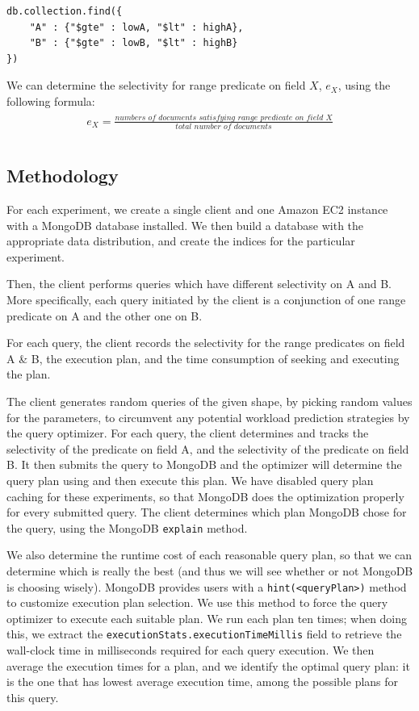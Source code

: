 \begin{lstlisting}[caption=Query Shape in MongoDB Query Syntax, label=algo:queryshape]
db.collection.find({
    "A" : {"$gte" : lowA, "$lt" : highA},
    "B" : {"$gte" : lowB, "$lt" : highB}
})
\end{lstlisting}

We can determine the selectivity for range predicate on field $X$, $e_X$, 
using the following formula:
\begin{align}
\begin{split}
 e_X= \frac{\textit{numbers of documents satisfying range 
 predicate on field X}}{\textit{total number of documents}} \\
 \end{split}
\end{align}

\subsection{Methodology}
For each experiment, we create a single client and 
one Amazon EC2 instance with a MongoDB database installed. 
We then build a database with the appropriate data distribution, and create the indices for the particular experiment.

Then, the client performs queries which have different 
selectivity on A and B. More specifically, each query 
initiated by the client is a conjunction of one range 
predicate on A and the other one on B.

For each query, the client records the selectivity for the 
range predicates on field A \& B, the execution plan, and 
the time consumption of seeking and executing the plan. 

The client generates random queries of the given shape, by picking random values for the parameters, to circumvent any potential workload prediction strategies by the query optimizer. For each query, the client determines and tracks the selectivity of the predicate on field A, and the selectivity of the predicate on field B. It then submits the query to MongoDB and the optimizer will determine the query plan using \approachName and then execute this plan. We have disabled query plan caching for these experiments, so that MongoDB does the optimization properly for every submitted query. The client determines which plan MongoDB chose for the query, using the MongoDB \verb|explain| method.

We also determine the runtime cost of each reasonable query plan, so that we can determine which is really the best (and thus we will see whether or not MongoDB is choosing wisely). %
MongoDB provides users with a \verb|hint(<queryPlan>)| method to customize execution plan selection. We use this method to force the query optimizer to execute each suitable plan. We run each plan ten times; when doing this, we extract the \texttt{execution\-Stats.\-execution\-Time\-Millis} field to retrieve
the wall-clock time in milliseconds required for each query execution. We then average the execution times for a plan, and we identify the optimal query plan: it is the one that has lowest average execution time, among the possible plans for this query.

